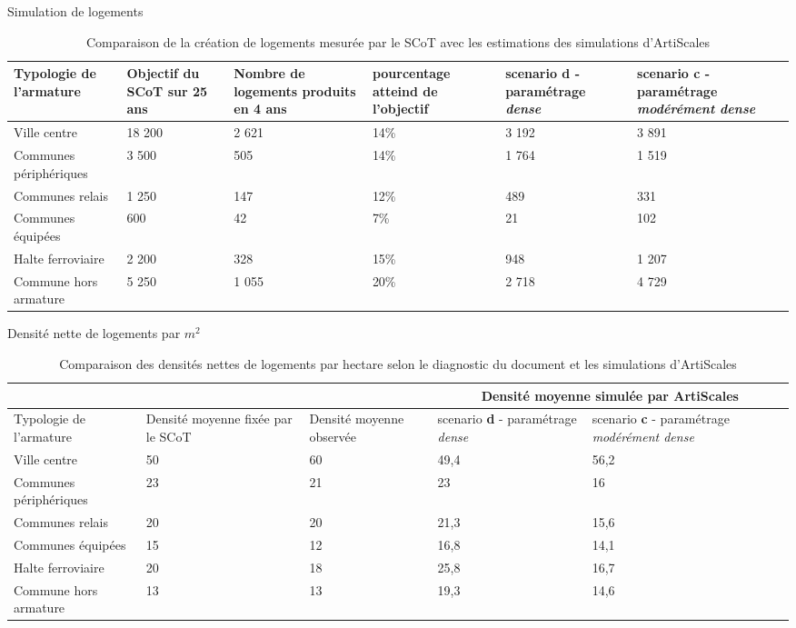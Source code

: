 \documentclass[xcolor=table]{beamer}
\begin{document}
\begin{frame}{Simulation de logements}
	\begin{table}[h]
		\caption{Comparaison de la création de logements mesurée par le SCoT avec les estimations des simulations d'ArtiScales}
		\label{Result:ConstLgt}
		\tiny
		\begin{center}
			\begin{tabular}{m{2.2cm}m{1.5cm}m{1.5cm}m{1cm}m{1.5cm}m{1.5cm}} 
				Typologie de l'armature&
				Objectif du SCoT sur 25 ans&
				Nombre de logements produits en 4 ans&
				pourcentage atteind de l'objectif&
				scenario \textbf{d} - paramétrage \textit{dense} 
				& scenario \textbf{c} - paramétrage \textit{modérément dense} \\
				\hline
				Ville centre&18 200&2 621&14\%&3 192&3 891\\\hline
				Communes périphériques&3 500&505&14\%&1 764&1 519\\\hline
				Communes relais &1 250&147&12\%&489&331\\\hline
				Communes équipées&600&42&7\%&21&102\\\hline
				Halte ferroviaire&2 200&328&15\%&948&1 207\\\hline
				Commune hors armature&5 250&1 055&20\%&2 718&4 729\\\hline
			\end{tabular}
		\end{center}
	\end{table}
\end{frame}

\begin{frame}{Densité nette de logements par $m^{2}$}
\begin{table}[h]
	\caption{Comparaison des densités nettes de logements par hectare selon le diagnostic du document et les simulations d'ArtiScales}
	\tiny 
	\begin{center}
		\begin{tabular}{m{2.5cm}m{1.5cm}m{1.3cm}m{2cm}m{2cm}}
			\toprule
			&&&\multicolumn{2}{c}{Densité moyenne simulée par ArtiScales} \\ \hline
			Typologie de l'armature &
			Densité moyenne fixée par le SCoT &
			Densité moyenne observée&
			scenario \textbf{d} - paramétrage \textit{dense} &
			scenario \textbf{c} - paramétrage \textit{modérément dense} \\ \hline
			Ville centre&50&60&49,4&56,2\\ \hline
			Communes périphériques&23&21&23&16\\ \hline
			Communes relais &20&20&21,3&15,6\\ \hline
			Communes équipées&15&12&16,8&14,1\\ \hline
			Halte ferroviaire&20&18&25,8&16,7 \\ \hline
			Commune hors armature&13&13&19,3 &14,6\\ \hline
		\end{tabular}
	\end{center}
\end{table}
\end{frame}
\end{document}
